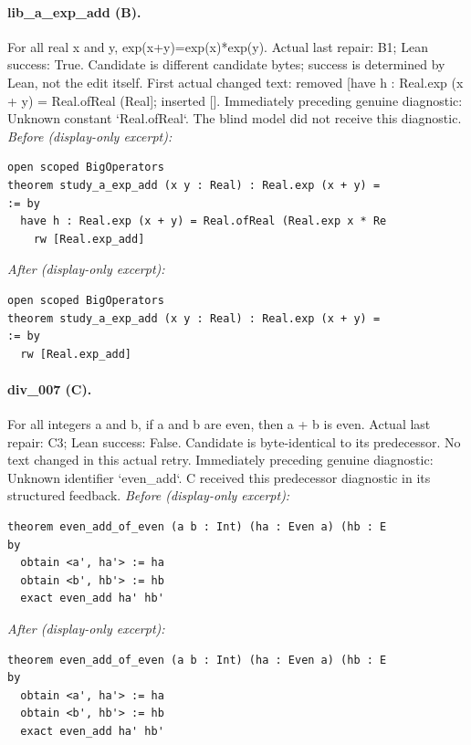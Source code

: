 \paragraph{lib\_a\_exp\_add (B).}
For all real x and y, exp(x+y)=exp(x)*exp(y).
Actual last repair: B1; Lean success: True. Candidate is different candidate bytes; success is determined by Lean, not the edit itself.
First actual changed text: removed [have h : Real.exp (x + y) = Real.ofReal (Real]; inserted [].
Immediately preceding genuine diagnostic: Unknown constant `Real.ofReal`.
The blind model did not receive this diagnostic.
\textit{Before (display-only excerpt):}
\begin{verbatim}
open scoped BigOperators
theorem study_a_exp_add (x y : Real) : Real.exp (x + y) =
:= by
  have h : Real.exp (x + y) = Real.ofReal (Real.exp x * Re
    rw [Real.exp_add]
\end{verbatim}
\textit{After (display-only excerpt):}
\begin{verbatim}
open scoped BigOperators
theorem study_a_exp_add (x y : Real) : Real.exp (x + y) =
:= by
  rw [Real.exp_add]
\end{verbatim}
\paragraph{div\_007 (C).}
For all integers a and b, if a and b are even, then a + b is even.
Actual last repair: C3; Lean success: False. Candidate is byte-identical to its predecessor.
No text changed in this actual retry.
Immediately preceding genuine diagnostic: Unknown identifier `even\_add`.
C received this predecessor diagnostic in its structured feedback.
\textit{Before (display-only excerpt):}
\begin{verbatim}
theorem even_add_of_even (a b : Int) (ha : Even a) (hb : E
by
  obtain <a', ha'> := ha
  obtain <b', hb'> := hb
  exact even_add ha' hb'
\end{verbatim}
\textit{After (display-only excerpt):}
\begin{verbatim}
theorem even_add_of_even (a b : Int) (ha : Even a) (hb : E
by
  obtain <a', ha'> := ha
  obtain <b', hb'> := hb
  exact even_add ha' hb'
\end{verbatim}
